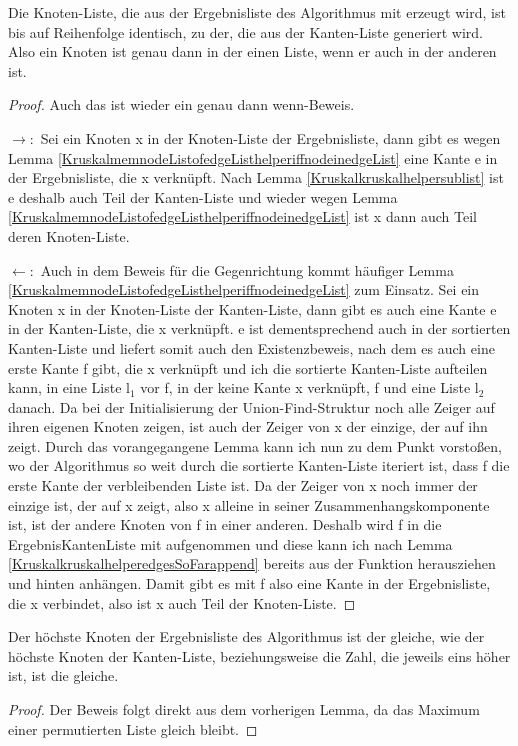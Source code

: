 \begin{lemma}[\KruskalnodeListofkruskalperm]
  Die Knoten-Liste, die aus der Ergebnisliste des Algorithmus mit \KruskalnodeListofedgeList erzeugt wird, ist bis auf Reihenfolge identisch, zu der, die aus der Kanten-Liste generiert wird.
  Also ein Knoten ist genau dann in der einen Liste, wenn er auch in der anderen ist.
\end{lemma}
\begin{proof}
  Auch das ist wieder ein \glqq genau dann wenn\grqq-Beweis.

  $\rightarrow:$
  Sei ein Knoten x in der Knoten-Liste der Ergebnisliste, dann gibt es wegen Lemma \ref{KruskalmemnodeListofedgeListhelperiffnodeinedgeList} eine Kante e in der Ergebnisliste, die x verknüpft.
  Nach Lemma \ref{Kruskalkruskalhelpersublist} ist e deshalb auch Teil der Kanten-Liste
  und wieder wegen Lemma \ref{KruskalmemnodeListofedgeListhelperiffnodeinedgeList} ist x dann auch Teil deren Knoten-Liste.

  $\leftarrow:$
  Auch in dem Beweis für die Gegenrichtung kommt häufiger Lemma \ref{KruskalmemnodeListofedgeListhelperiffnodeinedgeList} zum Einsatz.
  Sei ein Knoten x in der Knoten-Liste der Kanten-Liste, dann gibt es auch eine Kante e in der Kanten-Liste, die x verknüpft.
  e ist dementsprechend auch in der sortierten Kanten-Liste und liefert somit auch den Existenzbeweis, nach dem es auch eine erste Kante f gibt, die x verknüpft
  und ich die sortierte Kanten-Liste aufteilen kann, in eine Liste l$_1$ vor f, in der keine Kante x verknüpft, f und eine Liste l$_2$ danach.
  Da bei der Initialisierung der Union-Find-Struktur noch alle Zeiger auf ihren eigenen Knoten zeigen, ist auch der Zeiger von x der einzige, der auf ihn zeigt.
  Durch das vorangegangene Lemma kann ich nun zu dem Punkt vorstoßen, wo der Algorithmus so weit durch die sortierte Kanten-Liste iteriert ist, dass f die erste Kante der verbleibenden
  Liste ist. Da der Zeiger von x noch immer der einzige ist, der auf x zeigt, also x alleine in seiner Zusammenhangskomponente ist, ist der andere Knoten von f in einer anderen.
  Deshalb wird f in die ErgebnisKantenListe mit aufgenommen und diese kann ich nach Lemma \ref{KruskalkruskalhelperedgesSoFarappend} bereits aus der Funktion herausziehen und hinten anhängen.
  Damit gibt es mit f also eine Kante in der Ergebnisliste, die x verbindet, also ist x auch Teil der Knoten-Liste.
\end{proof}



\begin{lemma}[\KruskalnodeListofedgeListmaxeq]\label{KruskalnodeListofedgeListmaxeq}
  Der höchste Knoten der Ergebnisliste des Algorithmus ist der gleiche, wie der höchste Knoten der Kanten-Liste, beziehungsweise die Zahl, die jeweils eins höher ist, ist die gleiche.
\end{lemma}
\begin{proof}
  Der Beweis folgt direkt aus dem vorherigen Lemma, da das Maximum einer permutierten Liste gleich bleibt.
\end{proof}


